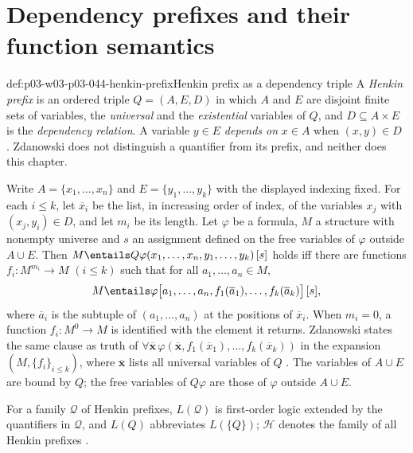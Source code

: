 \section{Dependency prefixes and their function semantics}
\label{sec:p03-w03-p03-044-prefix-syntax}

\begin{hbdefinition}{def:p03-w03-p03-044-henkin-prefix}{Henkin prefix as a dependency triple}
A \emph{Henkin prefix} is an ordered triple \(Q=(A,E,D)\) in which \(A\)
and \(E\) are disjoint finite sets of variables, the \emph{universal} and
the \emph{existential} variables of \(Q\), and \(D\subseteq A\times E\) is
the \emph{dependency relation}.  A variable \(y\in E\) \emph{depends on}
\(x\in A\) when \((x,y)\in D\)
\cite[p.~2]{Zdanowski2016HenkinArxiv}.  Zdanowski does not distinguish a
quantifier from its prefix, and neither does this chapter.

Write \(A=\{x_1,\ldots,x_n\}\) and \(E=\{y_1,\ldots,y_k\}\) with the
displayed indexing fixed.  For each \(i\le k\), let \(\overline{x}_i\) be
the list, in increasing order of index, of the variables \(x_j\) with
\((x_j,y_i)\in D\), and let \(m_i\) be its length.  Let \(\varphi\) be a
formula, \(M\) a structure with nonempty universe and \(s\) an assignment
defined on the free variables of \(\varphi\) outside \(A\cup E\).  Then
\(M\entails Q\varphi(x_1,\ldots,x_n,y_1,\ldots,y_k)\,[s]\) holds iff there
are functions \(f_i:M^{m_i}\to M\) \((i\le k)\) such that for all
\(a_1,\ldots,a_n\in M\),
\[
 M\entails\varphi\bigl[a_1,\ldots,a_n,
   f_1(\overline a_1),\ldots,f_k(\overline a_k)\bigr]\,[s],
\]
where \(\overline a_i\) is the subtuple of \((a_1,\ldots,a_n)\) at the
positions of \(\overline x_i\).  When \(m_i=0\), a function
\(f_i:M^{0}\to M\) is identified with the element it returns.  Zdanowski
states the same clause as truth of
\(\forall\overline{\mathbf x}\,\varphi(\overline{\mathbf x},f_1(\overline
x_1),\ldots,f_k(\overline x_k))\) in the expansion
\((M,\{f_i\}_{i\le k})\), where \(\overline{\mathbf x}\) lists all universal
variables of \(Q\) \cite[pp.~2--3]{Zdanowski2016HenkinArxiv}.  The variables
of \(A\cup E\) are bound by \(Q\); the free variables of \(Q\varphi\) are
those of \(\varphi\) outside \(A\cup E\).

For a family \(\mathcal Q\) of Henkin prefixes, \(L(\mathcal Q)\) is
first-order logic extended by the quantifiers in \(\mathcal Q\), and
\(L(Q)\) abbreviates \(L(\{Q\})\); \(\mathcal H\) denotes the family of all
Henkin prefixes \cite[p.~3]{Zdanowski2016HenkinArxiv}.


\end{hbdefinition}
